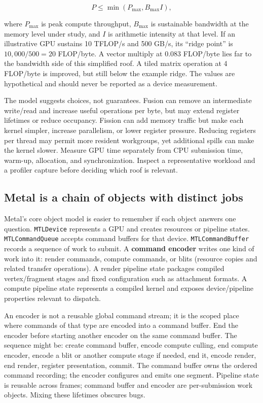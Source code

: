 \[
P\le \min(P_{\max}, B_{\max} I),
\]

where \(P_{\max}\) is peak compute throughput, \(B_{\max}\) is sustainable bandwidth at the memory level under study, and \(I\) is arithmetic intensity at that level. If an illustrative GPU sustains 10 TFLOP/s and 500 GB/s, its ``ridge point'' is \(10{,}000/500=20\) FLOP/byte. A vector multiply at 0.083 FLOP/byte lies far to the bandwidth side of this simplified roof. A tiled matrix operation at 4 FLOP/byte is improved, but still below the example ridge. The values are hypothetical and should never be reported as a device measurement.

The model suggests choices, not guarantees. Fusion can remove an intermediate write/read and increase useful operations per byte, but may extend register lifetimes or reduce occupancy. Fission can add memory traffic but make each kernel simpler, increase parallelism, or lower register pressure. Reducing registers per thread may permit more resident workgroups, yet additional spills can make the kernel slower. Measure GPU time separately from CPU submission time, warm-up, allocation, and synchronization. Inspect a representative workload and a profiler capture before deciding which roof is relevant.

\subsection{Metal is a chain of objects with distinct jobs}\label{05-engine-i-ch019-metal-is-a-chain-of-objects-with-distinct-jobs}

Metal's core object model is easier to remember if each object answers one question. \texttt{MTLDevice} represents a GPU and creates resources or pipeline states. \texttt{MTLCommandQueue} accepts command buffers for that device. \texttt{MTLCommandBuffer} records a sequence of work to submit. A \textbf{command encoder} writes one kind of work into it: render commands, compute commands, or blits (resource copies and related transfer operations). A render pipeline state packages compiled vertex/fragment stages and fixed configuration such as attachment formats. A compute pipeline state represents a compiled kernel and exposes device/pipeline properties relevant to dispatch.

An encoder is not a reusable global command stream; it is the scoped place where commands of that type are encoded into a command buffer. End the encoder before starting another encoder on the same command buffer. The sequence might be: create command buffer, encode compute culling, end compute encoder, encode a blit or another compute stage if needed, end it, encode render, end render, register presentation, commit. The command buffer owns the ordered command recording; the encoder configures and emits one segment. Pipeline state is reusable across frames; command buffer and encoder are per-submission work objects. Mixing these lifetimes obscures bugs.

